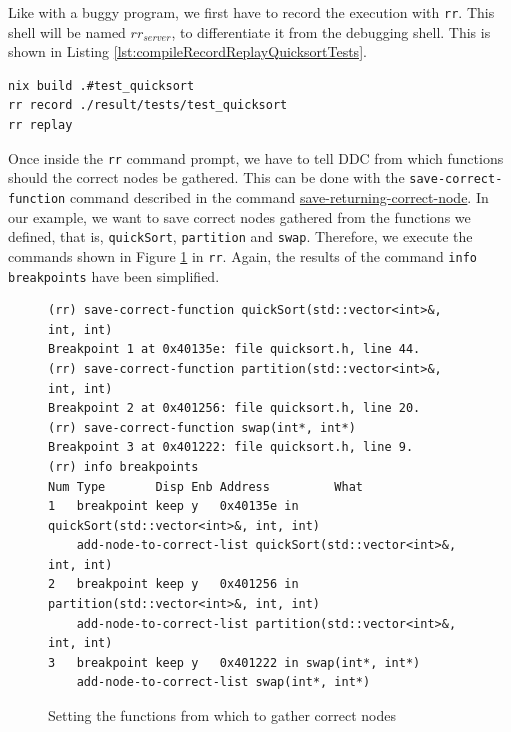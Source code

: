 Like with a buggy program, we first have to record the execution with \verb|rr|. This shell will be named \(rr_{server}\), to differentiate it from the debugging shell. This is shown in Listing \ref{lst:compileRecordReplayQuicksortTests}.
\begin{lstlisting}[language=bash, caption={Compiling, recording and replaying quickSort test cases}, frame=tb, label={lst:compileRecordReplayQuicksortTests}]
nix build .#test_quicksort
rr record ./result/tests/test_quicksort
rr replay
\end{lstlisting}
Once inside the \verb|rr| command prompt, we have to tell DDC from which functions should the correct nodes be gathered.
This can be done with the \verb|save-correct-function| command described in the command \hyperref[command:save-returning-correct-node]{save-returning-correct-node}. In our example, we want to save correct nodes gathered from the functions we defined, that is, \verb|quickSort|, \verb|partition| and \verb|swap|. Therefore, we execute the commands shown in Figure \ref{fig:saving-correct-functions} in \verb|rr|. Again, the results of the command \verb|info breakpoints| have been simplified.
\begin{figure}
    \centering
    \caption{Setting the functions from which to gather correct nodes}
    \label{fig:saving-correct-functions}
    \begin{verbatim}
(rr) save-correct-function quickSort(std::vector<int>&, int, int)
Breakpoint 1 at 0x40135e: file quicksort.h, line 44.
(rr) save-correct-function partition(std::vector<int>&, int, int)
Breakpoint 2 at 0x401256: file quicksort.h, line 20.
(rr) save-correct-function swap(int*, int*)
Breakpoint 3 at 0x401222: file quicksort.h, line 9.
(rr) info breakpoints
Num Type       Disp Enb Address         What
1   breakpoint keep y   0x40135e in quickSort(std::vector<int>&, int, int)
    add-node-to-correct-list quickSort(std::vector<int>&, int, int)
2   breakpoint keep y   0x401256 in partition(std::vector<int>&, int, int)
    add-node-to-correct-list partition(std::vector<int>&, int, int)
3   breakpoint keep y   0x401222 in swap(int*, int*)
    add-node-to-correct-list swap(int*, int*)
    \end{verbatim}
\end{figure}

